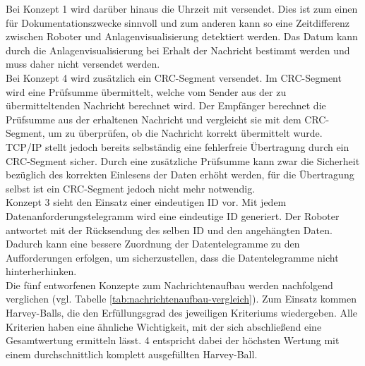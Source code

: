 \documentclass[ a4paper,
                oneside,
                toc=bibliography,
                toc=listof
                ]{scrbook}
\begin{document}
	Bei Konzept 1 wird darüber hinaus die Uhrzeit mit versendet. Dies ist zum einen für Dokumentationszwecke sinnvoll und zum anderen kann so eine Zeitdifferenz zwischen Roboter und Anlagenvisualisierung detektiert werden. Das Datum kann durch die Anlagenvisualisierung bei Erhalt der Nachricht bestimmt werden und muss daher nicht versendet werden. \\
	Bei Konzept 4 wird zusätzlich ein CRC-Segment versendet. Im CRC-Segment wird eine Prüfsumme übermittelt, welche vom Sender aus der zu übermitteltenden Nachricht berechnet wird. Der Empfänger berechnet die Prüfsumme aus der erhaltenen Nachricht und vergleicht sie mit dem CRC-Segment, um zu überprüfen, ob die Nachricht korrekt übermittelt wurde. TCP/IP stellt jedoch bereits selbständig eine fehlerfreie Übertragung durch ein CRC-Segment sicher. Durch eine zusätzliche Prüfsumme kann zwar die Sicherheit bezüglich des korrekten Einlesens der Daten erhöht werden, für die Übertragung selbst ist ein CRC-Segment jedoch nicht mehr notwendig. \\
	Konzept 3 sieht den Einsatz einer eindeutigen ID vor. Mit jedem Datenanforderungstelegramm wird eine eindeutige ID generiert. Der Roboter antwortet mit der Rücksendung des selben ID und den angehängten Daten. Dadurch kann eine bessere Zuordnung der Datentelegramme zu den Aufforderungen erfolgen, um sicherzustellen, dass die Datentelegramme nicht hinterherhinken.\\
	Die fünf entworfenen Konzepte zum Nachrichtenaufbau werden nachfolgend verglichen (vgl. Tabelle \ref{tab:nachrichtenaufbau-vergleich}). Zum Einsatz kommen Harvey-Balls, die den Erfüllungsgrad des jeweiligen Kriteriums wiedergeben. Alle Kriterien haben eine ähnliche Wichtigkeit, mit der sich abschließend eine Gesamtwertung ermitteln lässt. 4 entspricht dabei der höchsten Wertung mit einem durchschnittlich komplett ausgefüllten Harvey-Ball. \vspace{-5pt}
\end{document}
